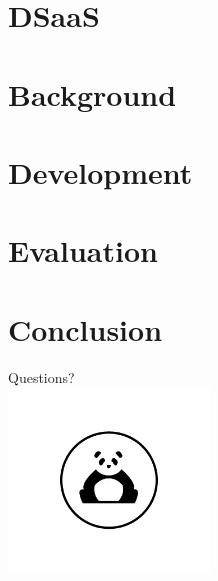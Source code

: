 \documentclass[10pt]{beamer}
\begin{document}
\section{DSaaS}




\maketitle


\section{Background}




\section{Development}





% 

\section{Evaluation}




\section{Conclusion}
% 


\printbibliography

\begin{frame}
\centering\Huge
	Questions? \\
	\includegraphics[width=0.4\textwidth]{images/panda_logo.png}
\end{frame}
\end{document}
